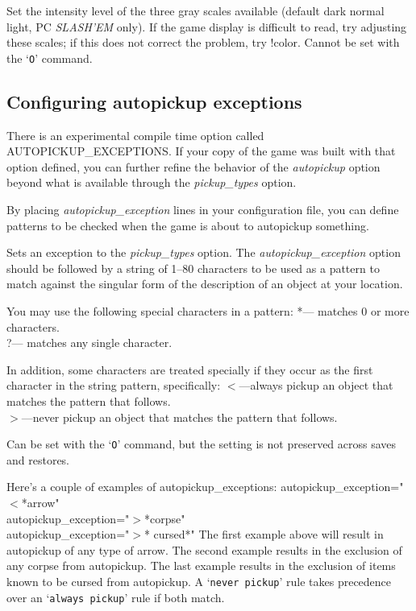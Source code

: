 \item[\ib{videoshades}]
Set the intensity level of the three gray scales available
(default dark normal light, PC {\it SLASH'EM\/} only).
If the game display is difficult to read, try adjusting these scales;
if this does not correct the problem, try !color.
Cannot be set with the `{\tt O}' command.
\elist
\nd %
\subsection*{Configuring autopickup exceptions}


There is an experimental compile time option called AUTOPICKUP\_EXCEPTIONS.  
If your copy of the game was built with that option defined, you can 
further refine the behavior of the
{\it autopickup\/} 
option beyond what is available through the 
{\it pickup_types\/} 
option. 

By placing 
{\it autopickup_exception\/} 
lines in your configuration
file, you can define patterns to be checked when the game is about to
autopickup something.
\blist{}

\item[\ib{autopickup\_exception}]
Sets an exception to the 
{\it pickup_types\/} 
option.
The
{\it autopickup_exception\/} 
option should be followed by a string of 1--80 characters to be used as a 
pattern to match against the singular form of the description of an 
object at your location.
\elist
\nd %

You may use the following special characters in a pattern:
  *--- matches 0 or more characters.\\
  ?--- matches any single character.

In addition, some characters are treated specially if they occur as the first 
character in the string pattern, specifically:
$<$---always pickup an object that matches the pattern that follows.\\
$>$---never pickup an object that matches the pattern that follows.

Can be set with the `{\tt O}' command, but the setting is not preserved
across saves and restores.

Here's a couple of examples of autopickup\_exceptions:
autopickup\_exception="$<$*arrow"\\
autopickup\_exception="$>$*corpse"\\
autopickup\_exception="$>$* cursed*"
The first example above will result in autopickup of any type of arrow.
The second example results in the exclusion of any corpse from autopickup.
The last example results in the exclusion of items known to be cursed from autopickup.
A `{\tt never pickup}' rule takes precedence over an `{\tt always pickup}' rule if both match.
